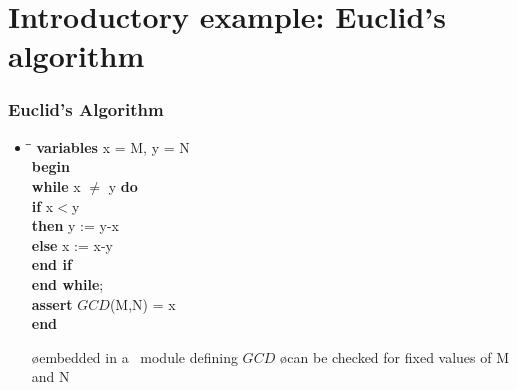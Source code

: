 \section{Introductory example: Euclid's algorithm}


\begin{frame}
  \frametitle{Euclid's Algorithm}

  \begin{itemize}
  \item {}

    \bigskip

    \hspace*{4em}
    \begin{minipage}{.5\linewidth}\small
    \begin{tabbing}
      \quad\=\quad\=\kill
      \textbf{variables} x = M, y = N\\
      \textbf{begin}\\
      \> \textbf{while} x $\neq$ y \textbf{do}\\
      \>\> \textbf{if} x$<$y\\
      \>\> \textbf{then} y := y-x\\
      \>\> \textbf{else} x := x-y\\
      \>\> \textbf{end if}\\
      \> \textbf{end while};\\
      \> \textbf{assert} $GCD$(M,N) = x\\
      \textbf{end}
    \end{tabbing}
    \end{minipage}

  \oo {}

    \begin{itemize}
    \o embedded in a \tlaplus\ module defining $GCD$
    \o can be checked for fixed values of M and N
    \end{itemize}
  \end{itemize}
\end{frame}


